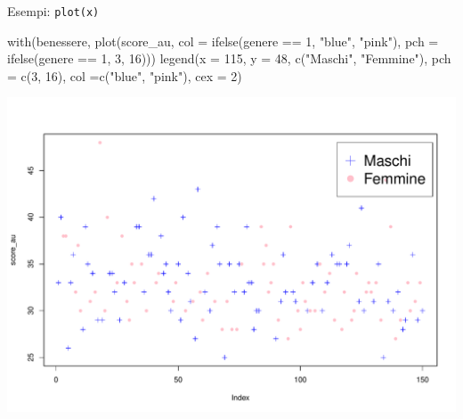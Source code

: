 \documentclass[
  ignorenonframetext,
]{beamer}
\newenvironment{Shaded}{\begin{snugshade}}{\end{snugshade}}
\newcommand{\AttributeTok}[1]{\textcolor[rgb]{0.00,0.34,0.68}{#1}}
\newcommand{\DecValTok}[1]{\textcolor[rgb]{0.69,0.50,0.00}{#1}}
\newcommand{\FunctionTok}[1]{\textcolor[rgb]{0.39,0.29,0.61}{#1}}
\newcommand{\NormalTok}[1]{\textcolor[rgb]{0.12,0.11,0.11}{#1}}
\newcommand{\SpecialCharTok}[1]{\textcolor[rgb]{0.24,0.68,0.91}{#1}}
\newcommand{\StringTok}[1]{\textcolor[rgb]{0.75,0.01,0.01}{#1}}
\begin{document}
\begin{frame}[fragile]{Esempi: \texttt{plot(x)}}
\protect\hypertarget{esempi-plotx}{}
\scriptsize

\begin{Shaded}
\begin{Highlighting}[]
\FunctionTok{with}\NormalTok{(benessere, }
     \FunctionTok{plot}\NormalTok{(score\_au, }
          \AttributeTok{col =} \FunctionTok{ifelse}\NormalTok{(genere }\SpecialCharTok{==} \DecValTok{1}\NormalTok{, }\StringTok{"blue"}\NormalTok{, }\StringTok{"pink"}\NormalTok{), }
          \AttributeTok{pch =} \FunctionTok{ifelse}\NormalTok{(genere }\SpecialCharTok{==} \DecValTok{1}\NormalTok{, }\DecValTok{3}\NormalTok{, }\DecValTok{16}\NormalTok{)))}
\FunctionTok{legend}\NormalTok{(}\AttributeTok{x =} \DecValTok{115}\NormalTok{, }\AttributeTok{y =} \DecValTok{48}\NormalTok{, }
       \FunctionTok{c}\NormalTok{(}\StringTok{"Maschi"}\NormalTok{, }\StringTok{"Femmine"}\NormalTok{), }\AttributeTok{pch =} \FunctionTok{c}\NormalTok{(}\DecValTok{3}\NormalTok{, }\DecValTok{16}\NormalTok{), }
       \AttributeTok{col =}\FunctionTok{c}\NormalTok{(}\StringTok{"blue"}\NormalTok{, }\StringTok{"pink"}\NormalTok{), }\AttributeTok{cex =} \DecValTok{2}\NormalTok{)}
\end{Highlighting}
\end{Shaded}

\begin{center}\includegraphics[width=0.7\linewidth]{Practice_files/figure-beamer/unnamed-chunk-38-1} \end{center}
\end{frame}
\end{document}
